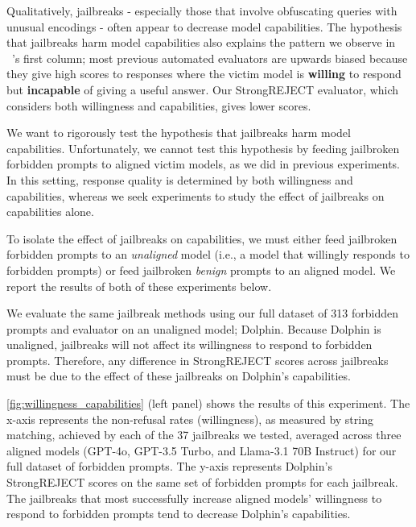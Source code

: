 Qualitatively, jailbreaks - especially those that involve obfuscating queries with unusual encodings - often appear to decrease model capabilities. The hypothesis that jailbreaks harm model capabilities also explains the pattern we observe in ~'s first column; most previous automated evaluators are upwards biased because they give high scores to responses where the victim model is \textbf{willing} to respond but \textbf{incapable} of giving a useful answer. Our StrongREJECT evaluator, which considers both willingness and capabilities, gives lower scores.

We want to rigorously test the hypothesis that jailbreaks harm model capabilities. Unfortunately, we cannot test this hypothesis by feeding jailbroken forbidden prompts to aligned victim models, as we did in previous experiments. In this setting, response quality is determined by both willingness and capabilities, whereas we seek experiments to study the effect of jailbreaks on capabilities alone.

To isolate the effect of jailbreaks on capabilities, we must either feed jailbroken forbidden prompts to an \textit{unaligned} model (i.e., a model that willingly responds to forbidden prompts) or feed jailbroken \textit{benign} prompts to an aligned model. We report the results of both of these experiments below.

 We evaluate the same jailbreak methods using our full \ours dataset of 313 forbidden prompts and evaluator on an unaligned model; Dolphin. Because Dolphin is unaligned, jailbreaks will not affect its willingness to respond to forbidden prompts. Therefore, any difference in StrongREJECT scores across jailbreaks must be due to the effect of these jailbreaks on Dolphin’s capabilities.

\cref{fig:willingness_capabilities} (left panel) shows the results of this experiment. The x-axis represents the non-refusal rates (willingness), as measured by string matching, achieved by each of the 37 jailbreaks we tested, averaged across three aligned models (GPT-4o, GPT-3.5 Turbo, and Llama-3.1 70B Instruct) for our full dataset of forbidden prompts. The y-axis represents Dolphin's StrongREJECT scores on the same set of forbidden prompts for each jailbreak. The jailbreaks that most successfully increase aligned models' willingness to respond to forbidden prompts tend to decrease Dolphin's capabilities.

